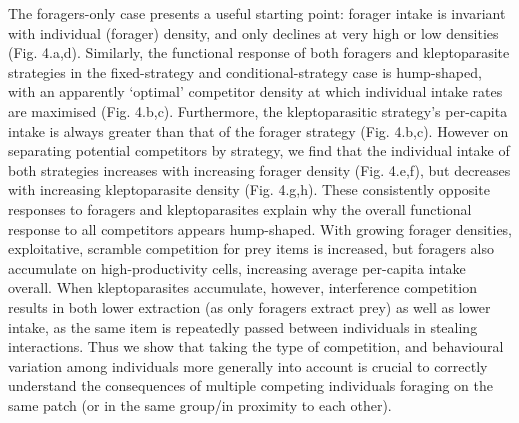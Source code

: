 \documentclass[11pt]{article}
\begin{document}
The foragers-only case presents a useful starting point: forager intake is invariant with individual (forager) density, and only declines at very high or low densities (Fig. 4.a,d).
Similarly, the functional response of both foragers and kleptoparasite strategies in the fixed-strategy and conditional-strategy case is hump-shaped, with an apparently `optimal' competitor density at which individual intake rates are maximised (Fig. 4.b,c).
Furthermore, the kleptoparasitic strategy's per-capita intake is always greater than that of the forager strategy (Fig. 4.b,c).
However on separating potential competitors by strategy, we find that the individual intake of both strategies increases with increasing forager density (Fig. 4.e,f), but decreases with increasing kleptoparasite density (Fig. 4.g,h).
These consistently opposite responses to foragers and kleptoparasites explain why the overall functional response to all competitors appears hump-shaped.
With growing forager densities, exploitative, scramble competition for prey items is increased, but foragers also accumulate on high-productivity cells, increasing average per-capita intake overall.
When kleptoparasites accumulate, however, interference competition results in both lower extraction (as only foragers extract prey) as well as lower intake, as the same item is repeatedly passed between individuals in stealing interactions.
Thus we show that taking the type of competition, and behavioural variation among individuals more generally into account is crucial to correctly understand the consequences of multiple competing individuals foraging on the same patch (or in the same group/in proximity to each other).


\end{document}
